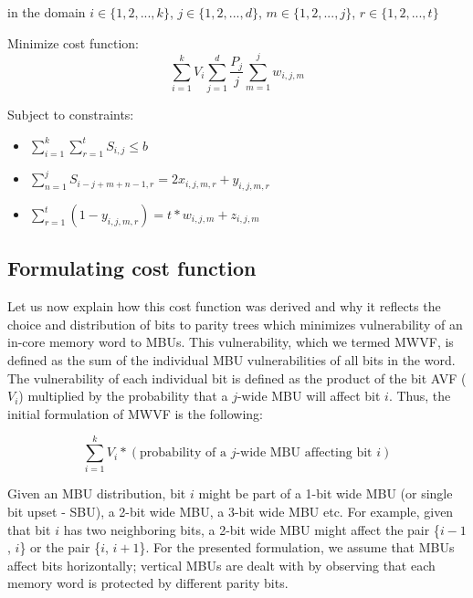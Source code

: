 \documentclass[12pt]{yalephd}
\begin{document}
in the domain $i \in \{1, 2, ..., k\}$, $j \in \{1, 2, ..., d\}$,  $m \in \{1, 2, ..., j\}$, $r \in \{1, 2, ..., t\}$


\vspace{0.1in}
\noindent Minimize cost function:
\begin{equation}
\sum_{i=1}^{k} V_i \sum_{j=1}^{d} \frac{P_j}{j} \sum_{m=1}^{j} w_{i,j,m}
\end{equation}

\noindent Subject to constraints:
\begin{itemize}\itemsep4pt
	\item $\sum_{i=1}^{k} \sum_{r=1}^{t} S_{i,j} \leq b$
	\item $\sum_{n=1}^{j} S_{i-j+m+n-1,r} = 2x_{i,j,m,r} + y_{i,j,m,r}$
	\item $\sum_{r=1}^{t} (1 - y_{i,j,m,r}) = t*w_{i,j,m} + z_{i,j,m}$
\end{itemize}


\subsection{Formulating cost function}\label{sC5sCostFunc}

Let us now explain how this cost function was derived and why it reflects the choice and distribution of bits to parity trees which minimizes vulnerability of an in-core memory word to MBUs. This vulnerability, which we termed MWVF, is defined as the sum of the individual MBU vulnerabilities of all bits in the word. The vulnerability of each individual bit is defined as the product of the bit AVF ($V_i$) multiplied by the probability that a $j$-wide MBU will affect bit $i$. Thus, the initial formulation of MWVF is the following:

\begin{equation}\label{eqInit}
\sum_{i=1}^{k} V_i * (\text{probability of a $j$-wide MBU affecting bit $i$})
\end{equation}

Given an MBU distribution, bit $i$ might be part of a 1-bit wide MBU (or single bit upset - SBU), a 2-bit wide MBU, a 3-bit wide MBU etc. For example, given that bit $i$ has two neighboring bits, a 2-bit wide MBU might affect the pair \{$i-1$, $i$\} or the pair \{$i$, $i+1$\}. For the presented formulation, we assume that MBUs affect bits horizontally; vertical MBUs are dealt with by observing that each memory word is protected by different parity bits.
\end{document}
